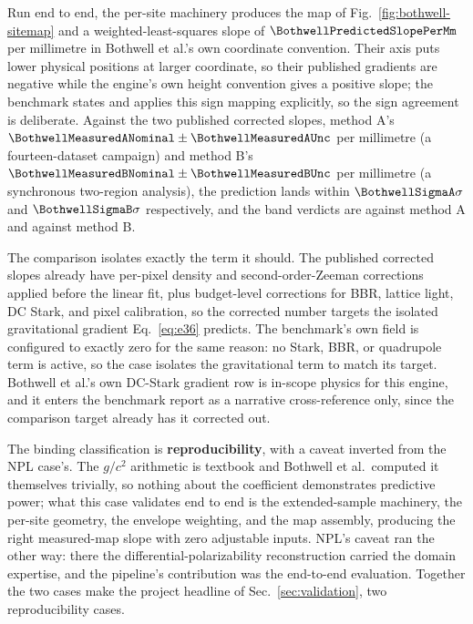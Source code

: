 \documentclass[aps,pra,superscriptaddress,groupedaddress,nofootinbib]{revtex4-2}
\begin{document}
Run end to end, the per-site machinery produces the map of
Fig.~\ref{fig:bothwell-sitemap} and a weighted-least-squares slope of
$\BothwellPredictedSlopePerMm$ per millimetre in Bothwell et al.'s own
coordinate convention. Their axis puts lower physical positions at
larger coordinate, so their published gradients are negative while the
engine's own height convention gives a positive slope; the benchmark
states and applies this sign mapping explicitly, so the sign agreement
is deliberate. Against the two published corrected slopes, method A's
$\BothwellMeasuredANominal\pm\BothwellMeasuredAUnc$ per millimetre (a
fourteen-dataset campaign) and method B's
$\BothwellMeasuredBNominal\pm\BothwellMeasuredBUnc$ per millimetre (a
synchronous two-region analysis), the prediction lands within
$\BothwellSigmaA\sigma$ and $\BothwellSigmaB\sigma$ respectively, and
the band verdicts are \textit{\BothwellVerdictA{}} against method A and
\textit{\BothwellVerdictB{}} against method B.

The comparison isolates exactly the term it should. The published
corrected slopes already have per-pixel density and
second-order-Zeeman corrections applied before the linear fit, plus
budget-level corrections for BBR, lattice light, DC Stark, and pixel
calibration, so the corrected number targets the isolated
gravitational gradient Eq.~\eqref{eq:e36} predicts. The benchmark's
own field is configured to exactly zero for the same reason: no Stark,
BBR, or quadrupole term is active, so the case isolates the
gravitational term to match its target. Bothwell et al.'s own DC-Stark
gradient row is in-scope physics for this engine, and it enters the
benchmark report as a narrative cross-reference only, since the
comparison target already has it corrected out.

The binding classification is \textbf{reproducibility}, with a caveat
inverted from the NPL case's. The $g/c^2$ arithmetic is textbook and
Bothwell et al.\ computed it themselves trivially, so nothing about
the coefficient demonstrates predictive power; what this case
validates end to end is the extended-sample machinery, the per-site
geometry, the envelope weighting, and the map assembly, producing the
right measured-map slope with zero adjustable inputs. NPL's caveat ran
the other way: there the differential-polarizability reconstruction
carried the domain expertise, and the pipeline's contribution was the
end-to-end evaluation. Together the two cases make the project
headline of Sec.~\ref{sec:validation}, two reproducibility cases.
\end{document}
